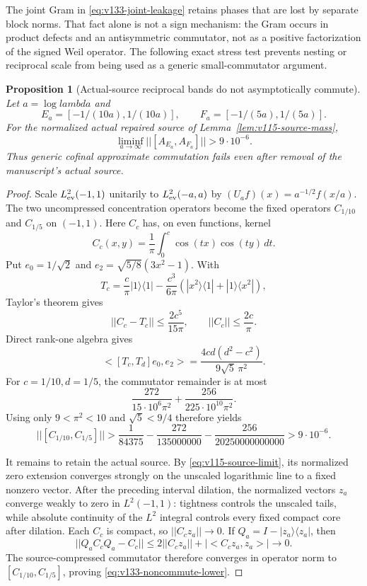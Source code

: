 \documentclass[11pt]{article}
\def\lambda{lambda}%
\def\norm#1{||#1||}%
\def\ip#1#2{<#1,#2>}%
\newtheorem{proposition}[theorem]{Proposition}
\theoremstyle{remark}
\newcommand{\norm}[1]{\left\lVert #1\right\rVert}
\newcommand{\ip}[2]{\left\langle #1,#2\right\rangle}
\begin{document}
The joint Gram in \eqref{eq:v133-joint-leakage} retains phases that are
lost by separate block norms.  That fact alone is not a sign mechanism:
the Gram occurs in product defects and an antisymmetric commutator, not
as a positive factorization of the signed Weil operator.  The following
exact stress test prevents nesting or reciprocal scale from being used
as a generic small-commutator argument.

\begin{proposition}[Actual-source reciprocal bands do not asymptotically commute]
\label{prop:v133-noncommute}
Let $a=\log\lambda$ and
\[
 E_a=[-1/(10a),1/(10a)],\qquad
 F_a=[-1/(5a),1/(5a)].
\]
For the normalized actual repaired source of
Lemma~\ref{lem:v115-source-mass},
\begin{equation}
 \liminf_{a\to\infty}
 \norm{[A_{E_a},A_{F_a}]}>9\cdot10^{-6}.
 \label{eq:v133-noncommute-lower}
\end{equation}
Thus generic cofinal approximate commutation fails even after removal of
the manuscript's actual source.
\end{proposition}
\begin{proof}
Scale $L^2_{\rm ev}(-1,1)$ unitarily to
$L^2_{\rm ev}(-a,a)$ by
$(U_af)(x)=a^{-1/2}f(x/a)$.  The two uncompressed concentration
operators become the fixed operators $C_{1/10}$ and $C_{1/5}$ on
$(-1,1)$.  Here $C_c$ has, on even functions, kernel
\[
 C_c(x,y)=\frac1\pi\int_0^c\cos(tx)\cos(ty)\,dt.
\]
Put $e_0=1/\sqrt2$ and
$e_2=\sqrt{5/8}(3x^2-1)$.  With
\[
 T_c=\frac c\pi|1\rangle\langle1|
 -\frac{c^3}{6\pi}
 (|x^2\rangle\langle1|+|1\rangle\langle x^2|),
\]
Taylor's theorem gives
\[
 \norm{C_c-T_c}\le\frac{2c^5}{15\pi},
 \qquad \norm{C_c}\le\frac{2c}{\pi}.
\]
Direct rank-one algebra gives
\[
 \ip{[T_c,T_d]e_0}{e_2}
 =\frac{4cd(d^2-c^2)}{9\sqrt5\,\pi^2}.
\]
For $c=1/10,d=1/5$, the commutator remainder is at most
\[
 \frac{272}{15\cdot10^6\pi^2}
 +\frac{256}{225\cdot10^{10}\pi^2}.
\]
Using only $9<\pi^2<10$ and $\sqrt5<9/4$ therefore yields
\[
 \norm{[C_{1/10},C_{1/5}]}
 >\frac1{84375}-\frac{272}{135000000}
 -\frac{256}{20250000000000}>9\cdot10^{-6}.
\]

It remains to retain the actual source.  By
\eqref{eq:v115-source-limit}, its normalized zero extension converges
strongly on the unscaled logarithmic line to a fixed nonzero vector.
After the preceding interval dilation, the normalized vectors $z_a$
converge weakly to zero in $L^2(-1,1)$: tightness controls the unscaled
tails, while absolute continuity of the $L^2$ integral controls every
fixed compact core after dilation.  Each $C_c$ is compact, so
$\norm{C_cz_a}\to0$.  If $Q_a=I-|z_a\rangle\langle z_a|$, then
\[
 \norm{Q_aC_cQ_a-C_c}
 \le2\norm{C_cz_a}+|\ip{C_cz_a}{z_a}|\longrightarrow0.
\]
The source-compressed commutator therefore converges in operator norm to
$[C_{1/10},C_{1/5}]$, proving \eqref{eq:v133-noncommute-lower}.
\end{proof}
\end{document}
